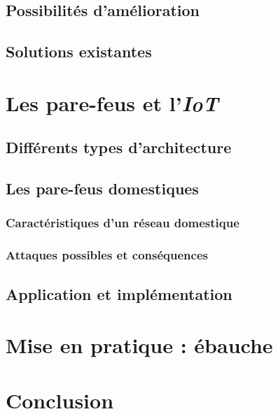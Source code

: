 \documentclass[]{article}
\begin{document}
\subsection{Possibilités d'amélioration}

\subsection{Solutions existantes}

\newpage
\section{Les pare-feus et l'\textit{IoT}}

\subsection{Différents types d'architecture}

\subsection{Les pare-feus domestiques}

\subsubsection{Caractéristiques d'un réseau domestique}

\subsubsection{Attaques possibles et conséquences}

\subsection{Application et implémentation}

\newpage

\section{Mise en pratique : ébauche}
\newpage
\section*{Conclusion}




\end{document}
